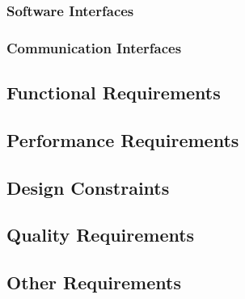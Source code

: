 	\subsubsection{Software Interfaces}
	\label{requirements:interfaces:software}

	\subsubsection{Communication Interfaces}
	\label{requirements:interfaces:communication}
	

\subsection{Functional Requirements}
\label{requirements:functional}


\subsection{Performance Requirements}
\label{requirements:performance}


\subsection{Design Constraints}
\label{requirements:constraints}


\subsection{Quality Requirements}
\label{requirements:quality}


\subsection{Other Requirements}
\label{requirements:other}
